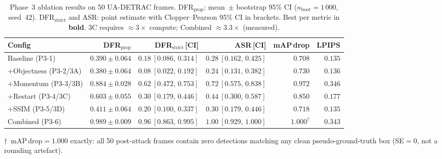 \documentclass[12pt,a4paper]{report}
\begin{document}
\begin{table}[htbp]
  \centering
  \caption{Phase~3 ablation results on 50 UA-DETRAC frames.
           DFR$_{\text{prop}}$: mean~$\pm$ bootstrap 95\% CI
           ($n_{\text{boot}}{=}1\,000$, seed~42).
           DFR$_{\text{strict}}$ and ASR: point estimate with
           Clopper--Pearson 95\% CI in brackets.
           Best per metric in \textbf{bold}.
           3C requires $\approx3\times$ compute; Combined $\approx3.3\times$ (measured).}
  \label{tab:phase3_results}
  \scriptsize
  \setlength{\tabcolsep}{4pt}
  \begin{tabular}{@{}l r r r r r@{}}
    \toprule
    \textbf{Config}
      & \textbf{DFR$_{\text{prop}}$}
      & \textbf{DFR$_{\text{strict}}$\,[CI]}
      & \textbf{ASR\,[CI]}
      & \textbf{mAP\,drop}
      & \textbf{LPIPS} \\
    \midrule
    Baseline (P3-1)
      & $0.390 \pm 0.064$
      & $0.18\ [0.086,\,0.314]$
      & $0.28\ [0.162,\,0.425]$
      & $0.708$ & $0.135$ \\
    +Objectness (P3-2/3A)
      & $0.380 \pm 0.064$
      & $0.08\ [0.022,\,0.192]$
      & $0.24\ [0.131,\,0.382]$
      & $0.730$ & $0.136$ \\
    +Momentum   (P3-3/3B)
      & $0.884 \pm 0.028$
      & $0.62\ [0.472,\,0.753]$
      & $0.72\ [0.575,\,0.838]$
      & $0.972$ & $0.346$ \\
    +Restart    (P3-4/3C)
      & $0.603 \pm 0.055$
      & $0.30\ [0.179,\,0.446]$
      & $0.44\ [0.300,\,0.587]$
      & $0.850$ & $0.177$ \\
    +SSIM       (P3-5/3D)
      & $0.411 \pm 0.064$
      & $0.20\ [0.100,\,0.337]$
      & $0.30\ [0.179,\,0.446]$
      & $0.718$ & $\mathbf{0.135}$ \\
    Combined    (P3-6)
      & $\mathbf{0.989 \pm 0.009}$
      & $\mathbf{0.96\ [0.863,\,0.995]}$
      & $\mathbf{1.00\ [0.929,\,1.000]}$
      & $\mathbf{1.000}^{\dagger}$ & $0.343$ \\
    \bottomrule
  \end{tabular}
  \par\smallskip
  {\footnotesize $\dagger$~mAP\,drop$=1.000$ exactly: all 50 post-attack frames
  contain zero detections matching any clean pseudo-ground-truth box
  (SE${=}0$, not a rounding artefact).}
\end{table}
\end{document}
